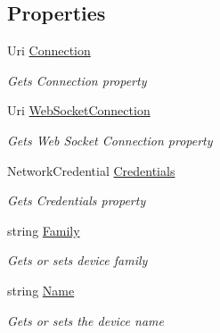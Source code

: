 \subsection*{Properties}
\begin{DoxyCompactItemize}
\item 
Uri \hyperlink{class_microsoft_1_1_tools_1_1_windows_device_portal_1_1_tests_1_1_mock_device_portal_connection_ab7fad1f5afcc26074ee23bbdf8abf771}{Connection}
\begin{DoxyCompactList}\small\item\em Gets Connection property \end{DoxyCompactList}\item 
Uri \hyperlink{class_microsoft_1_1_tools_1_1_windows_device_portal_1_1_tests_1_1_mock_device_portal_connection_a560252908982a10cff4b7d00b6c805cb}{Web\+Socket\+Connection}
\begin{DoxyCompactList}\small\item\em Gets Web Socket Connection property \end{DoxyCompactList}\item 
Network\+Credential \hyperlink{class_microsoft_1_1_tools_1_1_windows_device_portal_1_1_tests_1_1_mock_device_portal_connection_a40e82e69d4cbbd84f3a71b61d77a90a4}{Credentials}
\begin{DoxyCompactList}\small\item\em Gets Credentials property \end{DoxyCompactList}\item 
string \hyperlink{class_microsoft_1_1_tools_1_1_windows_device_portal_1_1_tests_1_1_mock_device_portal_connection_ae687c4bbf801283dca2b41d1b74fff7e}{Family}
\begin{DoxyCompactList}\small\item\em Gets or sets device family \end{DoxyCompactList}\item 
string \hyperlink{class_microsoft_1_1_tools_1_1_windows_device_portal_1_1_tests_1_1_mock_device_portal_connection_aa04eb1b147998b0c56a4fe265f395866}{Name}
\begin{DoxyCompactList}\small\item\em Gets or sets the device name \end{DoxyCompactList}\item 

\end{DoxyCompactItemize}
